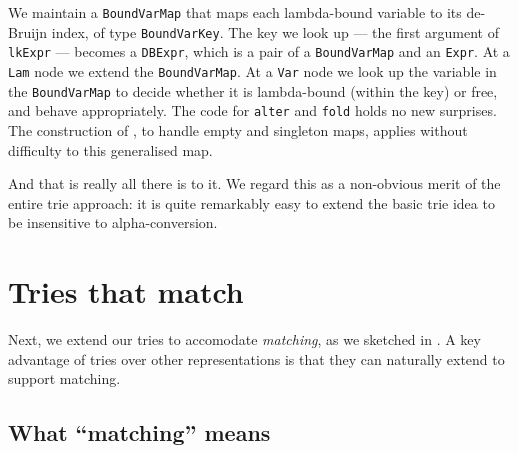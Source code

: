 \documentclass[acmsmall]{acmart}
\theoremstyle{theorem}
\theoremstyle{definition}
\theoremstyle{remark}
\begin{document}
We maintain a \lstinline{BoundVarMap}
that maps each lambda-bound variable to its de-Bruijn index, of type \lstinline{BoundVarKey}.
The key we look up --- the first argument of \lstinline{lkExpr} --- becomes
a \lstinline{DBExpr}, which is a pair of a \lstinline{BoundVarMap} and an
\lstinline{Expr}.
At a \lstinline{Lam}
node we extend the \lstinline{BoundVarMap}. At a \lstinline{Var} node we
look up the variable in the \lstinline{BoundVarMap} to decide whether it is
lambda-bound (within the key) or free, and behave appropriately.
The code for \lstinline{alter} and \lstinline{fold} holds no new surprises.
The construction of , to handle empty and singleton maps,
applies without difficulty to this generalised map.

And that is really all there is to it.  We regard this as a non-obvious merit
of the entire trie approach: it is quite remarkably easy to extend the basic
trie idea to be insensitive to alpha-conversion.

\section{Tries that match}

Next, we extend our tries to accomodate \emph{matching}, as we
sketched in .  A key advantage of tries over other representations is
that they can naturally extend to support matching.

\subsection{What ``matching'' means} \label{sec:matching-spec}
\end{document}
